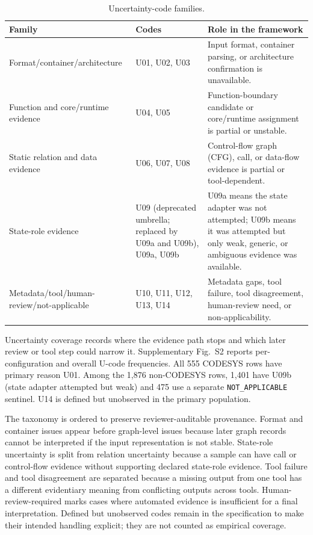 \documentclass[manuscript,screen,review]{acmart}
\begin{document}
\begin{table}[t]
\centering
\small
\caption{Uncertainty-code families.}
\label{tab:s5_2}
\begin{tabularx}{\textwidth}{>{\raggedright\arraybackslash}X>{\raggedright\arraybackslash}X>{\raggedright\arraybackslash}X}
\toprule
Family & Codes & Role in the framework \\
\midrule
Format/container/architecture & U01, U02, U03 & Input format, container parsing, or architecture confirmation is unavailable. \\
Function and core/runtime evidence & U04, U05 & Function-boundary candidate or core/runtime assignment is partial or unstable. \\
Static relation and data evidence & U06, U07, U08 & Control-flow graph (CFG), call, or data-flow evidence is partial or tool-dependent. \\
State-role evidence & U09 (deprecated umbrella; replaced by U09a and U09b), U09a, U09b & U09a means the state adapter was not attempted; U09b means it was attempted but only weak, generic, or ambiguous evidence was available. \\
Metadata/tool/human-review/not-applicable & U10, U11, U12, U13, U14 & Metadata gaps, tool failure, tool disagreement, human-review need, or non-applicability. \\
\bottomrule
\end{tabularx}
\end{table}

Uncertainty coverage records where the evidence path stops and which later review or tool step could narrow it. Supplementary Fig.~S2 reports per-configuration and overall U-code frequencies. All 555 CODESYS rows have primary reason U01. Among the 1{,}876 non-CODESYS rows, 1{,}401 have U09b (state adapter attempted but weak) and 475 use a separate \texttt{NOT\_APPLICABLE} sentinel. U14 is defined but unobserved in the primary population.

The taxonomy is ordered to preserve reviewer-auditable provenance. Format and container issues appear before graph-level issues because later graph records cannot be interpreted if the input representation is not stable. State-role uncertainty is split from relation uncertainty because a sample can have call or control-flow evidence without supporting declared state-role evidence. Tool failure and tool disagreement are separated because a missing output from one tool has a different evidentiary meaning from conflicting outputs across tools. Human-review-required marks cases where automated evidence is insufficient for a final interpretation. Defined but unobserved codes remain in the specification to make their intended handling explicit; they are not counted as empirical coverage.
\end{document}
